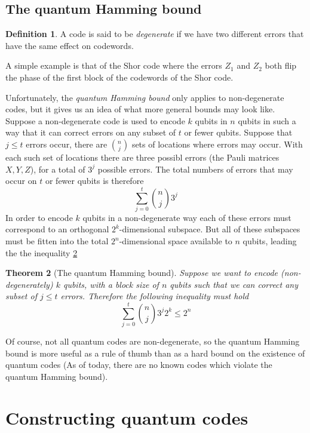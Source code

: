 \documentclass[11pt,a4paper]{article}
\theoremstyle{definition}
\newtheorem{definition}{Definition}[section]
\theoremstyle{plain}
\newtheorem{theorem}[definition]{Theorem}
\theoremstyle{remark}
\begin{document}
\subsection{The quantum Hamming bound} 

\begin{definition}
A code is said to be \emph{degenerate} if we have two different errors that have the same effect 
on codewords. 

A simple example is that of the Shor code where the errors $Z_1$ and $Z_2$ both flip the phase of the first block of the 
codewords of the Shor code. 
\end{definition}

Unfortunately, the \emph{quantum Hamming bound} only applies to non-degenerate codes, but it gives us an idea of what more general bounds 
may look like. Suppose a non-degenerate code is used to encode $k$ qubits in $n$ qubits in such a way that it can 
correct errors on any subset of $t$ or fewer qubits. Suppose that $j \leq t$ errors occur, there are $\binom{n}{j}$ sets of locations where errors may occur. 
With each such set of locations there are three possibl errors (the Pauli matrices $X, Y, Z$), for a total of $3^j$ possible errors. The total numbers of 
errors that may occur on $t$ or fewer qubits is therefore 
$$ \sum_{j = 0}^t \binom{n}{j} 3^j$$
In order to encode $k$ qubits in a non-degenerate way each of these errors must correspond to an orthogonal $2^k$-dimensional subspace. But all of these 
subspaces must be fitten into the total $2^n$-dimensional space available to $n$ qubits, leading the the inequality \ref{thm:quantum-hamming-bound}

\begin{theorem}[The quantum Hamming bound] \label{thm:quantum-hamming-bound}
Suppose we want to encode (non-degenerately) $k$ qubits, with a block size of $n$ qubits such that we can correct any subset of 
$j \leq t$ errors. Therefore the following inequality must hold 
$$\sum_{j = 0}^{t} \binom{n}{j} 3^j 2^k \leq 2^n$$ 
\end{theorem}

Of course, not all quantum codes are non-degenerate, so the quantum Hamming bound is more useful as a rule of thumb than as a hard 
bound on the existence of quantum codes (As of today, there are no known codes which violate the quantum Hamming bound). 

\section{Constructing quantum codes}
\end{document}
